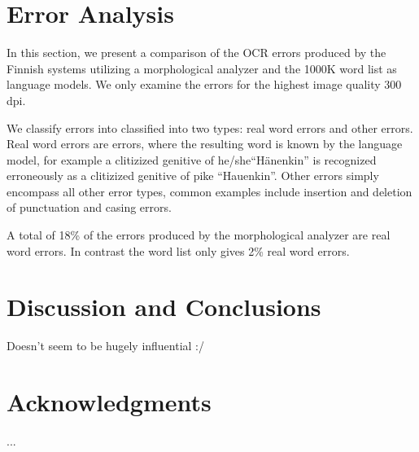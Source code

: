 \documentclass[b5paper]{article}
\begin{document}
\section{Error Analysis}
\label{err}

In this section, we present a comparison of the OCR errors produced by
the Finnish systems utilizing a morphological analyzer and the 1000K
word list as language models. We only examine the errors for the
highest image quality 300 dpi.

We classify errors into classified into two types: real word errors
and other errors. Real word errors are errors, where the resulting
word is known by the language model, for example a clitizized genitive
of he/she``Hänenkin'' is recognized erroneously as a clitizized
genitive of pike ``Hauenkin''. Other errors simply encompass all other
error types, common examples include insertion and deletion of
punctuation and casing errors.

A total of 18\% of the errors produced by the morphological analyzer
are real word errors. In contrast the word list only gives 2\% real
word errors.

\section{Discussion and Conclusions}
\label{disc}
Doesn't seem to be hugely influential :/
\section*{Acknowledgments}

...



\end{document}

